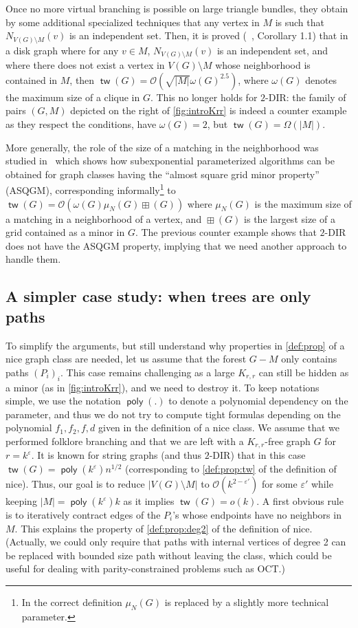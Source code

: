 \documentclass{amsart}
\newcommand{\eps}{\varepsilon}
\DeclareMathOperator\grid{\boxplus}
\DeclareMathOperator\tw{\textsf{tw}}
\DeclareMathOperator\poly{\textsf{poly}}
\renewcommand{\O}{\mathcal{O}}
\begin{document}
Once no more virtual branching is possible on large triangle bundles, they obtain by some additional specialized techniques that any vertex in $M$ is such that $N_{V(G)\setminus M}(v)$ is an independent set. Then, it is proved (~\cite{lokSODA22}, Corollary 1.1) that in a disk graph where for any $v \in M$, $N_{V(G)\setminus M}(v)$ is an independent set, and where there does not exist a vertex in $V(G) \setminus M$ whose neighborhood is
contained in $M$, then $\tw(G)=\O\left(\sqrt{|M|}\omega(G)^{2.5}\right)$, where $\omega(G)$ denotes the maximum size of a clique in $G$. This no longer holds for $2$-DIR: the family of pairs $(G,M)$ depicted on the right of \autoref{fig:introKrr} is indeed a counter example as they respect the conditions, have $\omega(G)=2$, but $\tw(G)=\Omega(|M|)$.

More generally, the role of the size of a matching in the neighborhood was studied in~\cite{berthe24ASQGM} which shows how subexponential parameterized algorithms can be obtained for graph classes having the ``almost square grid minor property'' (ASQGM), corresponding informally\footnote{In the correct definition $\mu_N(G)$ is replaced by a slightly more technical parameter.} to $\tw(G) = \O(\omega(G)\mu_N(G)\grid(G))$ where $\mu_N(G)$ is the maximum size of a matching in a neighborhood of a vertex, and $\grid(G)$ is the largest size of a grid contained as a minor in $G$.
The previous counter example shows that $2$-DIR does not have the ASQGM property, implying that we need another approach to handle them.

\subsection{A simpler case study: when trees are only paths}\label{sec:intro:paths}
To simplify the arguments, but still understand why properties in \autoref{def:prop} of a nice graph class are needed, let us assume that the forest $G-M$ only contains paths $(P_i)_i$.
This case remains challenging as a large $K_{r,r}$ can still be hidden as a minor (as in \autoref{fig:introKrr}), and we need to destroy it. 
To keep notations simple, we use the notation $\poly(.)$ to denote a polynomial dependency on the parameter, and thus we do not try to compute tight formulas depending on the polynomial $f_1,f_2,f,d$ given in the definition of a nice class.
We assume that we performed folklore branching and that we are left with a $K_{r,r}$-free graph $G$ for $r=k^{\eps}$.
It is known for string graphs (and thus $2$-DIR) that in this case $\tw(G)=  \poly(k^{\eps})n^{1/2}$ (corresponding to \autoref{def:prop:tw} of the definition of nice). Thus, our goal is to reduce $|V(G)\setminus M|$ to $\O(k^{2-\eps'})$ for some $\eps'$ while keeping $|M|=\poly(k^{\eps})k$ as it implies $\tw(G)=o(k)$.
A first obvious rule is to iteratively contract edges of the $P_i$'s whose endpoints have no neighbors in $M$. This explains the property of \autoref{def:prop:deg2} of the definition of nice. (Actually, we could only require that paths with internal vertices of degree 2 can be replaced with bounded size path without leaving the class, which could be useful for dealing with parity-constrained problems such as OCT.)
\end{document}
